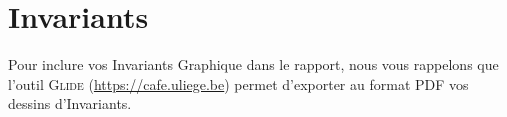 \section{Invariants}\label{invariants}
Pour inclure vos Invariants Graphique dans le rapport, nous vous rappelons que l'outil \textsc{Glide} (\url{https://cafe.uliege.be}) permet d'exporter au format PDF vos dessins d'Invariants.
